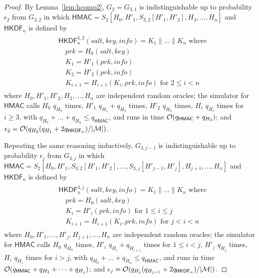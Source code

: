 \documentclass[compsoc, conference, letterpaper, 10pt, times]{IEEEtran}
\newcommand{\HKDF}{\mathsf{HKDF}}
\newcommand{\salt}{\mathit{salt}}
\newcommand{\key}{\mathit{key}}
\newcommand{\info}{\mathit{info}}
\newcommand{\prk}{\mathit{prk}}
\newcommand{\hmac}{\mathsf{HMAC}}
\newcommand{\Smac}{\mathcal{M}}
\newcommand{\ab}{\allowbreak}
\begin{document}
\begin{proof}
By Lemma~\ref{lem:hcomp2}, $G_2 = G_{3,1}$ is
indistinguishable up to probability $\epsilon_2$ from $G_{3,2}$ in which
$\hmac = S_2[H_0, \ab H'_1, \ab S_{3,2}[H'_1, H'_2], \ab H_3, \ab \ldots, \ab H_n]$ and $\HKDF_n$ is defined by
\begin{align*}
\begin{split}
&\HKDF^{3,2}_n(\salt,\key,\info) = K_1 \| \dots \| K_n \text{ where}\\
&\quad \prk = H_0(\salt,\key)\\
&\quad K_1 = H'_1(\prk, \info )\\
&\quad K_2 = H'_2(\prk, \info )\\
&\quad K_{i+1} = H_{i+1}(K_i, \prk, \info) \text{ for }2 \leq i < n
\end{split}
\end{align*}
where $H_0, H'_1, H'_2, H_3, \dots, H_n$ are independent random oracles;
the simulator for $\hmac$ calls 
$H_0$ $q_{H_0}$ times,
$H'_1$ $q_{H_1} + q_{H_2}$ times,
$H'_2$ $q_{H_2}$ times, $H_i$ $q_{H_i}$ times for $i \geq 3$, with
$q_{H_0} + \dots + q_{H_n} \leq q_{\hmac}$, and runs in time 
${\cal O}(q_{\hmac} + q_{H_2})$; and
$\epsilon_2 = {\cal O}(q_{H_2}(q_{H_1} + 2 q_{\HKDF_n})/|\Smac|)$.

Repeating the same reasoning inductively, 
$G_{3,j-1}$ is
indistinguishable up to probability $\epsilon_{j}$ from $G_{3,j}$ in which
$\hmac = S_2[H_0, \ab H'_1, \ab S_{3,2}[H'_1, H'_2], \ab \dots, \ab S_{3,j}[H'_{j-1}, H'_{j}], \ab H_{j+1}, \ab \ldots, \ab H_n]$ and $\HKDF_n$ is defined by
\begin{align*}
\begin{split}
&\HKDF^{3,j}_n(\salt,\key,\info) = K_1 \| \dots \| K_n \text{ where}\\
&\quad \prk = H_0(\salt,\key)\\
&\quad K_i = H'_i(\prk, \info )\text{ for }1 \leq i \leq j\\
&\quad K_{i+1} = H_{i+1}(K_i, \prk, \info) \text{ for }j < i < n
\end{split}
\end{align*}
where $H_0, H'_1, \dots, H'_{j}, H_{j+1}, \dots, H_n$ are independent random oracles;
the simulator for $\hmac$ calls 
$H_0$ $q_{H_0}$ times,
$H'_i$ $q_{H_i} + q_{H_{i+1}}$ times for $1 \leq i < j$,
$H'_{j}$ $q_{H_{j}}$ times, $H_i$ $q_{H_i}$ times for $i > j$, with
$q_{H_0} + \dots + q_{H_n} \leq q_{\hmac}$, and runs in time 
${\cal O}(q_{\hmac} + q_{H_2} + \dots + q_{H_{j}})$; and
$\epsilon_{j} = {\cal O}(q_{H_{j}}(q_{H_{j-1}} + 2 q_{\HKDF_n})/|\Smac|)$.


\end{proof}
\end{document}
